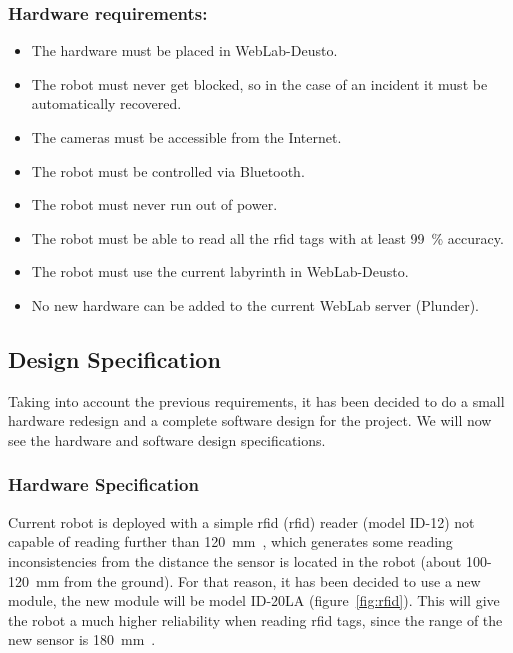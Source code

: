 \subsubsection{Hardware requirements:}

\begin{itemize}
	\item The hardware must be placed in WebLab-Deusto.
	\item The robot must never get blocked, so in the case of an incident it must be automatically
	recovered.
	\item The cameras must be accessible from the Internet.
	\item The robot must be controlled via Bluetooth.
	\item The robot must never run out of power.
	\item The robot must be able to read all the \acrshort{rfid} tags with at least 99~\% accuracy.
	\item The robot must use the current labyrinth in WebLab-Deusto.
	\item No new hardware can be added to the current WebLab server (Plunder).
\end{itemize}

\subsection{Design Specification}

Taking into account the previous requirements, it has been decided to do a small hardware redesign
and a complete software design for the project. We will now see the hardware and software design
specifications.

\subsubsection{Hardware Specification}

Current robot is deployed with a simple \acrshort{rfid} (\acrlong{rfid}) reader (model ID-12) not
capable of reading further than 120~mm~\cite{rfid}, which generates some reading inconsistencies from
the distance the sensor is located in the robot (about 100-120~mm from the ground). For that reason,
it has been decided to use a new module, the new module will be model ID-20LA
(figure~\ref{fig:rfid}). This will give the robot a much higher reliability when reading
\acrshort{rfid} tags, since the range of the new sensor is 180~mm~\cite{rfid}.

